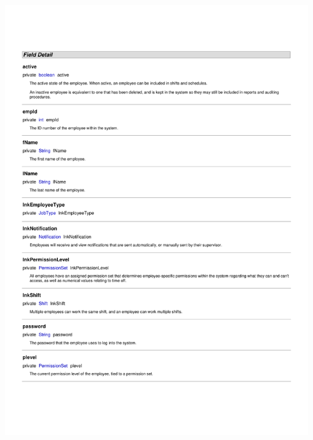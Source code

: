\documentclass[letterpaper,12pt]{report}
\begin{document}
\includegraphics[scale=0.9,trim=20mm 30mm 25mm 25mm]{externals/ProblemDomainDataDictionary2.pdf}
\newpage
\end{document}
